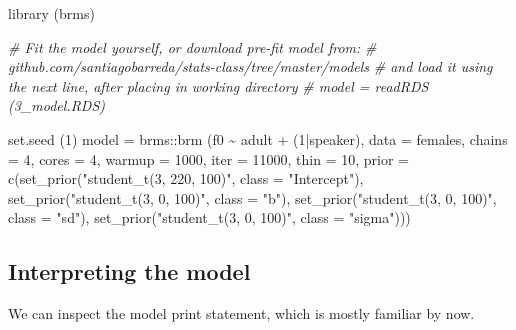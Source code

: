 \documentclass[
]{book}
\newenvironment{Shaded}{\begin{snugshade}}{\end{snugshade}}
\newcommand{\AttributeTok}[1]{\textcolor[rgb]{0.77,0.63,0.00}{#1}}
\newcommand{\CommentTok}[1]{\textcolor[rgb]{0.56,0.35,0.01}{\textit{#1}}}
\newcommand{\DecValTok}[1]{\textcolor[rgb]{0.00,0.00,0.81}{#1}}
\newcommand{\FunctionTok}[1]{\textcolor[rgb]{0.00,0.00,0.00}{#1}}
\newcommand{\NormalTok}[1]{#1}
\newcommand{\OtherTok}[1]{\textcolor[rgb]{0.56,0.35,0.01}{#1}}
\newcommand{\SpecialCharTok}[1]{\textcolor[rgb]{0.00,0.00,0.00}{#1}}
\newcommand{\StringTok}[1]{\textcolor[rgb]{0.31,0.60,0.02}{#1}}
\begin{document}
\begin{Shaded}
\begin{Highlighting}[]
\FunctionTok{library}\NormalTok{ (brms)}
\end{Highlighting}
\end{Shaded}

\begin{Shaded}
\begin{Highlighting}[]
\CommentTok{\# Fit the model yourself, or download pre{-}fit model from: }
\CommentTok{\# github.com/santiagobarreda/stats{-}class/tree/master/models}
\CommentTok{\# and load it using the next line, after placing in working directory}
\CommentTok{\# model = readRDS (\textquotesingle{}3\_model.RDS\textquotesingle{})}

\FunctionTok{set.seed}\NormalTok{ (}\DecValTok{1}\NormalTok{)}
\NormalTok{model }\OtherTok{=}  
\NormalTok{  brms}\SpecialCharTok{::}\FunctionTok{brm}\NormalTok{ (f0 }\SpecialCharTok{\textasciitilde{}}\NormalTok{ adult }\SpecialCharTok{+}\NormalTok{ (}\DecValTok{1}\SpecialCharTok{|}\NormalTok{speaker), }\AttributeTok{data =}\NormalTok{ females, }\AttributeTok{chains =} \DecValTok{4}\NormalTok{, }\AttributeTok{cores =} \DecValTok{4}\NormalTok{,}
       \AttributeTok{warmup =} \DecValTok{1000}\NormalTok{, }\AttributeTok{iter =} \DecValTok{11000}\NormalTok{, }\AttributeTok{thin =} \DecValTok{10}\NormalTok{,}
       \AttributeTok{prior =} \FunctionTok{c}\NormalTok{(}\FunctionTok{set\_prior}\NormalTok{(}\StringTok{"student\_t(3, 220, 100)"}\NormalTok{, }\AttributeTok{class =} \StringTok{"Intercept"}\NormalTok{),}
                 \FunctionTok{set\_prior}\NormalTok{(}\StringTok{"student\_t(3, 0, 100)"}\NormalTok{, }\AttributeTok{class =} \StringTok{"b"}\NormalTok{),}
                 \FunctionTok{set\_prior}\NormalTok{(}\StringTok{"student\_t(3, 0, 100)"}\NormalTok{, }\AttributeTok{class =} \StringTok{"sd"}\NormalTok{),}
                 \FunctionTok{set\_prior}\NormalTok{(}\StringTok{"student\_t(3, 0, 100)"}\NormalTok{, }\AttributeTok{class =} \StringTok{"sigma"}\NormalTok{)))}
\end{Highlighting}
\end{Shaded}

\hypertarget{interpreting-the-model}{%
\subsection{Interpreting the model}\label{interpreting-the-model}}

We can inspect the model print statement, which is mostly familiar by now.
\end{document}
